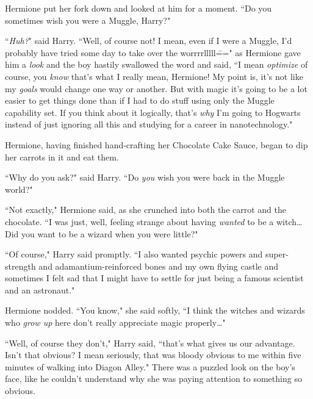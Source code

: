 Hermione put her fork down and looked at him for a moment. ``Do you sometimes wish you were a Muggle, Harry?"

``\emph{Huh?}" said Harry. ``Well, of course not! I mean, even if I were a Muggle, I'd probably have tried some day to take over the worrrrlllll\===" as Hermione gave him a \emph{look} and the boy hastily swallowed the word and said, ``I mean \emph{optimize} of course, you \emph{know} that's what I really mean, Hermione! My point is, it's not like my \emph{goals} would change one way or another. But with magic it's going to be a lot easier to get things done than if I had to do stuff using only the Muggle capability set. If you think about it logically, that's \emph{why} I'm going to Hogwarts instead of just ignoring all this and studying for a career in nanotechnology."

Hermione, having finished hand-crafting her Chocolate Cake Sauce, began to dip her carrots in it and eat them.

``Why do you ask?" said Harry. ``Do \emph{you} wish you were back in the Muggle world?"

``Not exactly," Hermione said, as she crunched into both the carrot and the chocolate. ``I was just, well, feeling strange about having \emph{wanted} to be a witch{\ldots} Did you want to be a wizard when you were little?"

``Of course," Harry said promptly. ``I also wanted psychic powers and super-strength and adamantium-reinforced bones and my own flying castle and sometimes I felt sad that I might have to settle for just being a famous scientist and an astronaut."

Hermione nodded. ``You know," she said softly, ``I think the witches and wizards who \emph{grow up} here don't really appreciate magic properly{\ldots}"

``Well, of course they don't," Harry said, ``that's what gives us our advantage. Isn't that obvious? I mean seriously, that was bloody obvious to me within five minutes of walking into Diagon Alley." There was a puzzled look on the boy's face, like he couldn't understand why she was paying attention to something so obvious.


